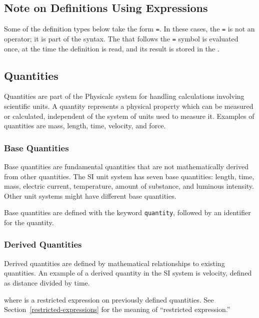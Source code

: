 \subsection{Note on Definitions Using Expressions}

Some of the definition types below take the form \id{}\verb|=|\expr{}.
In these cases, the \verb|=| is not an operator; it is part of the
syntax.  The \expr{} that follows the \verb|=| symbol is evaluated
once, at the time the definition is read, and its result is stored in
the \id{}.


\subsection{Quantities}
\label{quantities}

Quantities are part of the Physicalc system for handling calculations
involving scientific units.  A quantity represents a physical property
which can be measured or calculated, independent of the system of
units used to measure it.  Examples of quantities are mass, length,
time, velocity, and force.

\subsubsection{Base Quantities}

Base quantities are fundamental quantities that are not mathematically
derived from other quantities.  The SI unit system has seven base
quantities: length, time, mass, electric current, temperature, amount
of substance, and luminous intensity.\cite{si} Other unit systems
might have different base quantities.

Base quantities are defined with the keyword \verb+quantity+, followed
by an identifier for the quantity.  

\begin{syntax}
 \id{}
\end{syntax}


\subsubsection{Derived Quantities}

Derived quantities are defined by mathematical relationships to
existing quantities.  An example of a derived quantity in the SI
system is velocity, defined as distance divided by time.

\begin{syntax}
 \id{} \key{=} \expr{}
\end{syntax}
where \expr{} is a restricted expression on previously defined
quantities.  See Section~\ref{restricted-expressions} for the meaning
of ``restricted expression.''

